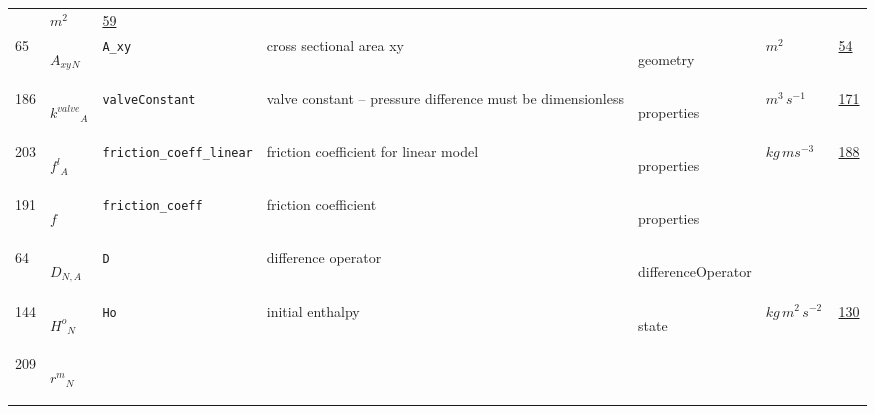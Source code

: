 \begin{longtable}{|p{1cm}|p{2.5cm}|p{4.5cm}|p{8cm}|p{3.0cm}|p{3cm}|p{1cm}|}
             & $ m^{2} \, $
             &                 \hyperlink{"e:59"}{ 59 }
                 \\
            65
             & \hypertarget{"v:65"}{ $ {{A_{xy}}}{_{N}} $}
             & \verb|A_xy|
             & cross sectional area xy
             & \begin{lay}geometry \end{lay}
             & $ m^{2} \, $
             &                 \hyperlink{"e:54"}{ 54 }
                 \\
            186
             & \hypertarget{"v:186"}{ $ {{k^{valve}}}{_{A}} $}
             & \verb|valveConstant|
             & valve constant -- pressure difference must be dimensionless
             & \begin{lay}properties \end{lay}
             & $ m^{3} \,s^{-1} \, $
             &                 \hyperlink{"e:171"}{ 171 }
                 \\
            203
             & \hypertarget{"v:203"}{ $ {{f^l}}{_{A}} $}
             & \verb|friction_coeff_linear|
             & friction coefficient for linear model
             & \begin{lay}properties \end{lay}
             & $ kg \,m s^{-3} \, $
             &                 \hyperlink{"e:188"}{ 188 }
                 \\
            191
             & \hypertarget{"v:191"}{ $ {{f}}{_{}} $}
             & \verb|friction_coeff|
             & friction coefficient
             & \begin{lay}properties \end{lay}
             & $  $
             & \\
            64
             & \hypertarget{"v:64"}{ $ {D}{_{N, A}} $}
             & \verb|D|
             & difference operator
             & \begin{lay}differenceOperator \end{lay}
             & $  $
             & \\
            144
             & \hypertarget{"v:144"}{ $ {{H^o}}{_{N}} $}
             & \verb|Ho|
             & initial enthalpy
             & \begin{lay}state \end{lay}
             & $ kg \,m^{2} \,s^{-2} \, $
             &                 \hyperlink{"e:130"}{ 130 }
                 \\
            209
             & \hypertarget{"v:209"}{ $ {{r^m}}{_{N}} $}

\end{longtable}
